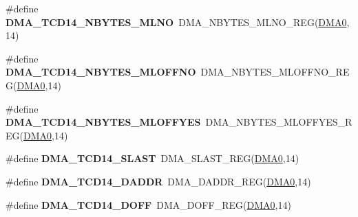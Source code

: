 \begin{DoxyCompactItemize}
\item 
\#define {\bfseries D\+M\+A\+\_\+\+T\+C\+D14\+\_\+\+N\+B\+Y\+T\+E\+S\+\_\+\+M\+L\+NO}~D\+M\+A\+\_\+\+N\+B\+Y\+T\+E\+S\+\_\+\+M\+L\+N\+O\+\_\+\+R\+EG(\hyperlink{group__DMA__Peripheral__Access__Layer_ga4103044f9ca209772f513dc694513ffb}{D\+M\+A0},14)\hypertarget{group__DMA__Register__Accessor__Macros_gad159ef0686c8df4b74a7ec03a33daa2f}{}\label{group__DMA__Register__Accessor__Macros_gad159ef0686c8df4b74a7ec03a33daa2f}

\item 
\#define {\bfseries D\+M\+A\+\_\+\+T\+C\+D14\+\_\+\+N\+B\+Y\+T\+E\+S\+\_\+\+M\+L\+O\+F\+F\+NO}~D\+M\+A\+\_\+\+N\+B\+Y\+T\+E\+S\+\_\+\+M\+L\+O\+F\+F\+N\+O\+\_\+\+R\+EG(\hyperlink{group__DMA__Peripheral__Access__Layer_ga4103044f9ca209772f513dc694513ffb}{D\+M\+A0},14)\hypertarget{group__DMA__Register__Accessor__Macros_ga6fc9c29bae31d5e07932ea7271bd3d02}{}\label{group__DMA__Register__Accessor__Macros_ga6fc9c29bae31d5e07932ea7271bd3d02}

\item 
\#define {\bfseries D\+M\+A\+\_\+\+T\+C\+D14\+\_\+\+N\+B\+Y\+T\+E\+S\+\_\+\+M\+L\+O\+F\+F\+Y\+ES}~D\+M\+A\+\_\+\+N\+B\+Y\+T\+E\+S\+\_\+\+M\+L\+O\+F\+F\+Y\+E\+S\+\_\+\+R\+EG(\hyperlink{group__DMA__Peripheral__Access__Layer_ga4103044f9ca209772f513dc694513ffb}{D\+M\+A0},14)\hypertarget{group__DMA__Register__Accessor__Macros_ga47cbe5e87621d4d2b323561413ac05b5}{}\label{group__DMA__Register__Accessor__Macros_ga47cbe5e87621d4d2b323561413ac05b5}

\item 
\#define {\bfseries D\+M\+A\+\_\+\+T\+C\+D14\+\_\+\+S\+L\+A\+ST}~D\+M\+A\+\_\+\+S\+L\+A\+S\+T\+\_\+\+R\+EG(\hyperlink{group__DMA__Peripheral__Access__Layer_ga4103044f9ca209772f513dc694513ffb}{D\+M\+A0},14)\hypertarget{group__DMA__Register__Accessor__Macros_gacf0b581267dc9a83559b9f89655b6919}{}\label{group__DMA__Register__Accessor__Macros_gacf0b581267dc9a83559b9f89655b6919}

\item 
\#define {\bfseries D\+M\+A\+\_\+\+T\+C\+D14\+\_\+\+D\+A\+D\+DR}~D\+M\+A\+\_\+\+D\+A\+D\+D\+R\+\_\+\+R\+EG(\hyperlink{group__DMA__Peripheral__Access__Layer_ga4103044f9ca209772f513dc694513ffb}{D\+M\+A0},14)\hypertarget{group__DMA__Register__Accessor__Macros_gad1b405904b78f29167e9ca3ec3f67c05}{}\label{group__DMA__Register__Accessor__Macros_gad1b405904b78f29167e9ca3ec3f67c05}

\item 
\#define {\bfseries D\+M\+A\+\_\+\+T\+C\+D14\+\_\+\+D\+O\+FF}~D\+M\+A\+\_\+\+D\+O\+F\+F\+\_\+\+R\+EG(\hyperlink{group__DMA__Peripheral__Access__Layer_ga4103044f9ca209772f513dc694513ffb}{D\+M\+A0},14)\hypertarget{group__DMA__Register__Accessor__Macros_ga65c1a27d4fcad9497503d722426ea346}{}\label{group__DMA__Register__Accessor__Macros_ga65c1a27d4fcad9497503d722426ea346}


\end{DoxyCompactItemize}
